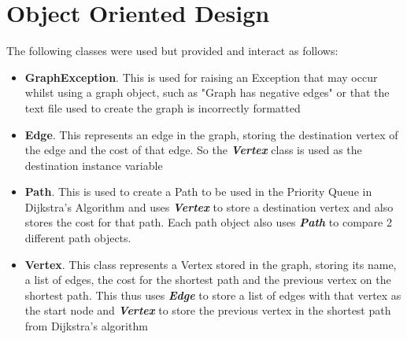 \documentclass{assignment}
\begin{document}

\graphicspath{ {./assets/} }

\newpage

\section{Object Oriented Design}

The following classes were used but provided and interact as follows:
\begin{itemize}
    \item \textbf{GraphException}. This is used for raising an Exception that may occur whilst using a graph object, such as "Graph has negative edges" or that the text file used to create the graph is incorrectly formatted
    \item \textbf{Edge}. This represents an edge in the graph, storing the destination vertex of the edge and the cost of that edge. So the \textbf{\textit{Vertex}} class is used as the destination instance variable
    
    \item \textbf{Path}. This is used to create a Path to be used in the Priority Queue in Dijkstra's Algorithm and uses \textbf{\textit{Vertex}} to store a destination vertex and also stores the cost for that path. Each path object also uses \textbf{\textit{Path}} to compare 2 different path objects.
    
    \item \textbf{Vertex}. This class represents a Vertex stored in the graph, storing its name, a list of edges, the cost for the shortest path and the previous vertex on the shortest path. This thus uses \textbf{\textit{Edge}} to store a list of edges with that vertex as the start node and \textbf{\textit{Vertex}} to store the previous vertex in the shortest path from Dijkstra's algorithm
    
\end{itemize}
\end{document}
